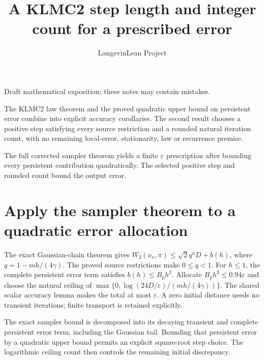 \documentclass[11pt,a4paper]{article}
\title{\texorpdfstring{A KLMC2 step length and integer count for a prescribed error}{A KLMC2 step length and integer count for a prescribed error}}
\author{LangevinLean Project}
\date{}
\begin{document}
\maketitle
Draft mathematical exposition; these notes may contain mistakes.


The KLMC2 law theorem and the proved quadratic upper bound on persistent error combine into explicit accuracy corollaries. The second result chooses a positive step satisfying every source restriction and a rounded natural iteration count, with no remaining local-error, stationarity, law or recurrence premise.



The full corrected sampler theorem yields a finite \(\varepsilon\) prescription after bounding every persistent contribution quadratically. The selected positive step and rounded count bound the output error.


\section{\texorpdfstring{Apply the sampler theorem to a quadratic error allocation}{Apply the sampler theorem to a quadratic error allocation}}


The exact Gaussian-chain theorem gives \(W_2(\nu_n,\pi)\le\sqrt2q^nD+b(h)\), where \(q=1-mh/(4\gamma)\). The proved source restrictions make \(0\le q<1\). For \(h\le1\), the complete persistent error term satisfies \(b(h)\le B_ph^2\). Allocate \(B_ph^2\le0.94\varepsilon\) and choose the natural ceiling of \(\max\{0,\log(24D/\varepsilon)/(mh/(4\gamma))\}\). The shared scalar accuracy lemma makes the total at most \(\varepsilon\). A zero initial distance needs no transient iterations; finite transport is retained explicitly.



The exact sampler bound is decomposed into its decaying transient and complete persistent error term, including the Gaussian tail. Bounding that persistent error by a quadratic upper bound permits an explicit square-root step choice. The logarithmic ceiling count then controls the remaining initial discrepancy.
\end{document}
